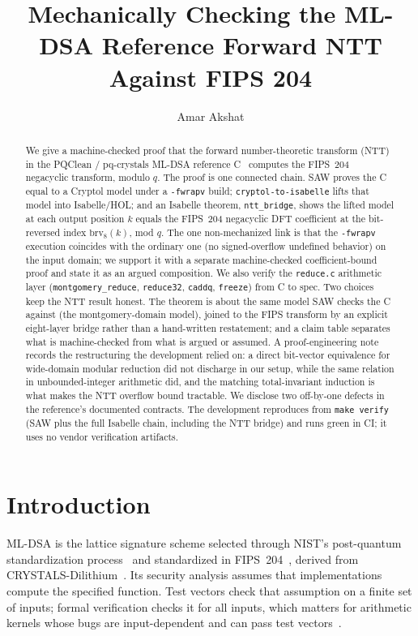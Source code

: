 \documentclass[journal=tches,submission,review]{iacrtrans}
\title{Mechanically Checking the ML-DSA Reference Forward NTT Against FIPS 204}
\author{Amar Akshat}
\institute{Independent Researcher, \email{amar.akshat@gmail.com}}
\newcommand{\code}[1]{\texttt{#1}}
\begin{document}
\maketitle

\begin{abstract}
We give a machine-checked proof that the forward number-theoretic transform (NTT) in the
PQClean / pq-crystals ML-DSA reference C~\cite{pqclean,dilithiumref} computes the FIPS~204~\cite{fips204}
negacyclic transform, modulo $q$. The proof is one connected chain. SAW proves the C equal to a Cryptol
model under a \code{-fwrapv} build; \code{cryptol-to-isabelle} lifts that model into Isabelle/HOL; and an
Isabelle theorem, \code{ntt\_bridge}, shows the lifted model at each output position $k$ equals the
FIPS~204 negacyclic DFT coefficient at the bit-reversed index $\mathrm{brv}_8(k)$, mod $q$. The one
non-mechanized link is that the \code{-fwrapv} execution coincides with the ordinary one (no
signed-overflow undefined behavior) on the input domain; we support it with a separate machine-checked
coefficient-bound proof and state it as an argued composition. We also verify the \code{reduce.c}
arithmetic layer (\code{montgomery\_reduce}, \code{reduce32}, \code{caddq}, \code{freeze}) from C to
spec. Two choices keep the NTT result honest. The theorem is about the same model SAW checks the C
against (the montgomery-domain model), joined to the FIPS transform by an explicit eight-layer bridge
rather than a hand-written restatement; and a claim table separates what is machine-checked from what is
argued or assumed. A proof-engineering note records the restructuring the development relied on: a direct
bit-vector equivalence for wide-domain modular reduction did not discharge in our setup, while the same
relation in unbounded-integer arithmetic did, and the matching total-invariant induction is what makes
the NTT overflow bound tractable. We disclose two off-by-one defects in the reference's documented
contracts. The development reproduces from \code{make verify} (SAW plus the full Isabelle chain,
including the NTT bridge) and runs green in CI; it uses no vendor verification artifacts.
\end{abstract}

\section{Introduction}\label{sec:intro}

ML-DSA is the lattice signature scheme selected through NIST's post-quantum standardization
process~\cite{nistpqc} and standardized in FIPS~204~\cite{fips204}, derived from
CRYSTALS-Dilithium~\cite{dilithium}. Its security analysis assumes that implementations compute the
specified function. Test vectors check that assumption on a finite set of inputs; formal verification
checks it for all inputs, which matters for arithmetic kernels whose bugs are input-dependent and can
pass test vectors~\cite{eprint1032}.
\end{document}
